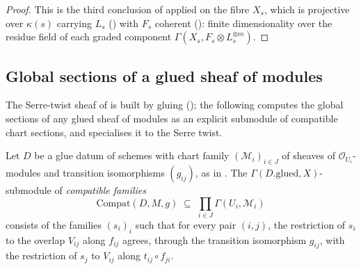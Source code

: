 \begin{proof}
  This is the third conclusion of  applied on
  the fibre \(X_s\), which is projective over \(\kappa(s)\) carrying \(L_s\)
  () with \(F_s\) coherent
  (): finite dimensionality over the
  residue field of each graded component
  \(\Gamma(X_s, F_s \otimes L_s^{\otimes m})\).
\end{proof}

\subsection{Global sections of a glued sheaf of modules}
\label{subsec:glue_gamma_compatible}

The Serre-twist sheaf of  is built by gluing
(); the following computes the global sections
of any glued sheaf of modules as an explicit submodule of compatible chart
sections, and specialises it to the Serre twist.

\begin{definition}
  \label{def:glue_gamma_compatible}
  \leanok
  Let \(D\) be a glue datum of schemes with chart family
  \((\mathcal M_i)_{i \in J}\) of sheaves of \(\mathcal O_{U_i}\)-modules and
  transition isomorphisms \((g_{ij})\), as in .
  The \(\Gamma(D.\mathrm{glued}, X)\)-submodule of \emph{compatible families}
  \[
    \mathrm{Compat}(D, M, g) \;\subseteq\; \prod_{i \in J} \Gamma(U_i, \mathcal M_i)
  \]
  consists of the families \((s_i)_i\) such that for every pair \((i,j)\),
  the restriction of \(s_i\) to the overlap \(V_{ij}\) along \(f_{ij}\)
  agrees, through the transition isomorphism \(g_{ij}\), with the
  restriction of \(s_j\) to \(V_{ij}\) along \(t_{ij} \circ f_{ji}\).
\end{definition}

